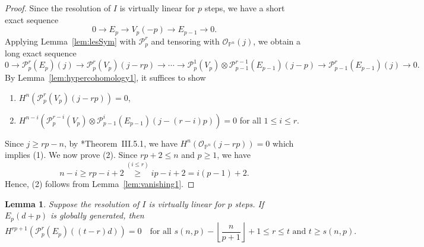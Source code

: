 \documentclass[11pt,letterpaper,reqno]{amsart}
\newcommand{\mc}[1]{\mathcal{#1}}
\def\PP{{\mathbb P}}
\def\lra{\longrightarrow}
\newtheorem{lemma}[theorem]{Lemma}
\theoremstyle{definition}
\numberwithin{equation}{section}
\begin{document}
\begin{proof}
Since the resolution of $I$ is virtually linear for $p$ steps, we have a short exact sequence
\[0 \lra E_p \lra V_p(-p) \lra E_{p-1} \lra 0.\]
Applying Lemma~\ref{lem:lesSym} with $\mc{P}_p^r$ and tensoring with $\mc{O}_{\PP^n}(j)$, we obtain a long exact sequence
\[0 \lra \mc{P}^r_p (E_p) (j) \lra \mc{P}^r_p(V_p) (j - rp) \lra \cdots \lra \mc{P}^1_p(V_p) \otimes \mc{P}^{r-1}_{p-1}(E_{p-1})(j-p) \lra \mc{P}^{r}_{p-1}(E_{p-1})(j) \lra 0.\]
By Lemma~\ref{lem:hypercohomology1}, it suffices to show 
\begin{enumerate}
    \item $H^n(\mc{P}^r_p(V_p) (j - rp)) = 0$,
    \item $H^{n-i}(\mc{P}^{r-i}_p(V_p) \otimes \mc{P}^{i}_{p-1}(E_{p-1})(j- (r-i)p)) = 0$ for all $1 \le i \le r.$
\end{enumerate}
Since $j \ge rp-n$, by \cite{Hartshorne}*{Theorem~III.5.1}, we have $H^n(\mc{O}_{\PP^n}(j-rp)) = 0$ which implies (1). We now prove (2). Since $rp+2 \le n$ and $p \ge 1$, we have
\[n-i \ge rp-i+2 \overset{(i\le r)}{\ge} ip-i+2 = i(p-1)+2.\]
Hence, (2) follows from Lemma~\ref{lem:vanishing1}.
\end{proof}
\begin{lemma}\label{lem:vanishing2}
    Suppose the resolution of $I$ is virtually linear for $p$ steps. If $E_p(d+p)$ is globally generated, then 
    \[H^{rp+1}(\mc{P}^r_p(E_p) ((t-r)d)) = 0 \quad \text{for all }s(n,p) - \left\lfloor \frac{n}{p+1}\right\rfloor + 1 \le r \le t \text{ and } t \ge s(n,p).\]
\end{lemma}
\end{document}
